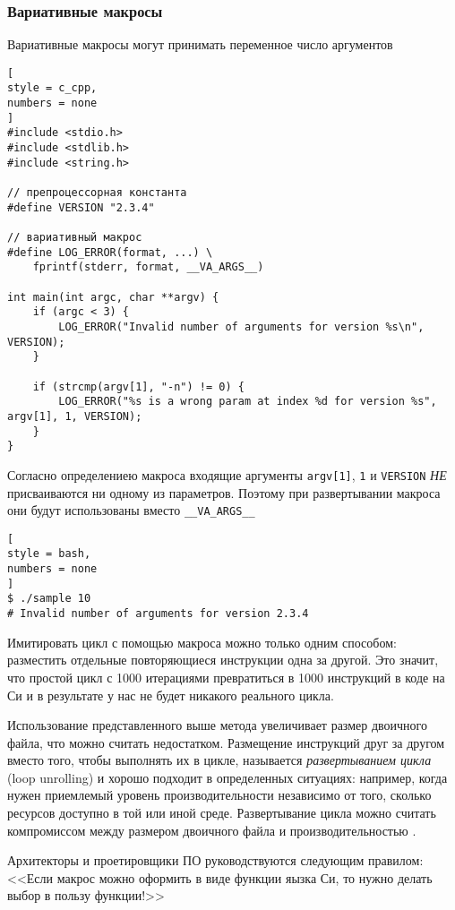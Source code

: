 \documentclass[%
	11pt,
	a4paper,
	utf8,
		]{article}
\begin{document}
\subsubsection{Вариативные макросы}

Вариативные макросы могут принимать переменное число аргументов
\begin{lstlisting}[
style = c_cpp,
numbers = none
]
#include <stdio.h>
#include <stdlib.h>
#include <string.h>

// препроцессорная константа
#define VERSION "2.3.4"

// вариативный макрос
#define LOG_ERROR(format, ...) \
    fprintf(stderr, format, __VA_ARGS__)
    
int main(int argc, char **argv) {
    if (argc < 3) {
        LOG_ERROR("Invalid number of arguments for version %s\n", VERSION);
    }
    
    if (strcmp(argv[1], "-n") != 0) {
        LOG_ERROR("%s is a wrong param at index %d for version %s", argv[1], 1, VERSION);
    }
}
\end{lstlisting}

Согласно определениею макроса входящие аргументы \verb|argv[1]|, \verb|1| и \verb|VERSION| \emph{НЕ} присваиваются ни одному из параметров. Поэтому при развертывании макроса они будут использованы вместо \verb|__VA_ARGS__|
\begin{lstlisting}[
style = bash,
numbers = none
]
$ ./sample 10
# Invalid number of arguments for version 2.3.4
\end{lstlisting}

Имитировать цикл с помощью макроса можно только одним способом: разместить отдельные повторяющиеся инструкции одна за другой. Это значит, что простой цикл с 1000 итерациями превратиться в 1000 инструкций в коде на Си и в результате у нас не будет никакого реального цикла.

Использование представленного выше метода увеличивает размер двоичного файла, что можно считать недостатком. Размещение инструкций друг за другом вместо того, чтобы выполнять их в цикле, называется \emph{развертыванием цикла} (loop unrolling) и хорошо подходит в определенных ситуациях: например, когда нужен приемлемый уровень производительности независимо от того, сколько ресурсов доступно в той или иной среде. Развертывание цикла можно считать компромиссом между размером двоичного файла и производительностью \cite[]{amini-extreme-c:2022}.

Архитекторы и проетировщики ПО руководствуются следующим правилом: <<Если макрос можно оформить в виде функции яызка Си, то нужно делать выбор в пользу функции!>>
\end{document}
